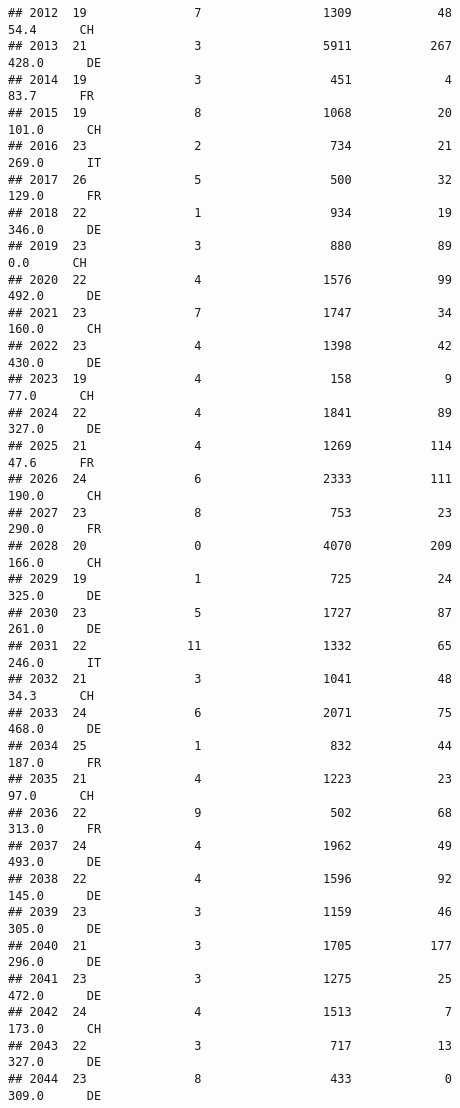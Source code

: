 \documentclass[
]{article}
\begin{document}
\begin{verbatim}
## 2012  19               7                 1309            48     54.4      CH
## 2013  21               3                 5911           267    428.0      DE
## 2014  19               3                  451             4     83.7      FR
## 2015  19               8                 1068            20    101.0      CH
## 2016  23               2                  734            21    269.0      IT
## 2017  26               5                  500            32    129.0      FR
## 2018  22               1                  934            19    346.0      DE
## 2019  23               3                  880            89      0.0      CH
## 2020  22               4                 1576            99    492.0      DE
## 2021  23               7                 1747            34    160.0      CH
## 2022  23               4                 1398            42    430.0      DE
## 2023  19               4                  158             9     77.0      CH
## 2024  22               4                 1841            89    327.0      DE
## 2025  21               4                 1269           114     47.6      FR
## 2026  24               6                 2333           111    190.0      CH
## 2027  23               8                  753            23    290.0      FR
## 2028  20               0                 4070           209    166.0      CH
## 2029  19               1                  725            24    325.0      DE
## 2030  23               5                 1727            87    261.0      DE
## 2031  22              11                 1332            65    246.0      IT
## 2032  21               3                 1041            48     34.3      CH
## 2033  24               6                 2071            75    468.0      DE
## 2034  25               1                  832            44    187.0      FR
## 2035  21               4                 1223            23     97.0      CH
## 2036  22               9                  502            68    313.0      FR
## 2037  24               4                 1962            49    493.0      DE
## 2038  22               4                 1596            92    145.0      DE
## 2039  23               3                 1159            46    305.0      DE
## 2040  21               3                 1705           177    296.0      DE
## 2041  23               3                 1275            25    472.0      DE
## 2042  24               4                 1513             7    173.0      CH
## 2043  22               3                  717            13    327.0      DE
## 2044  23               8                  433             0    309.0      DE

\end{verbatim}
\end{document}
